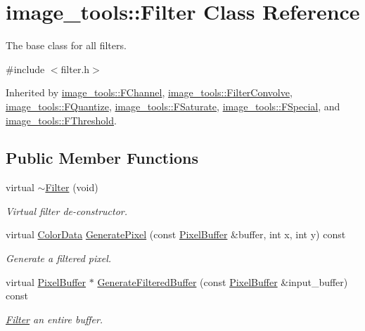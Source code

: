 \hypertarget{classimage__tools_1_1Filter}{}\section{image\+\_\+tools\+:\+:Filter Class Reference}
\label{classimage__tools_1_1Filter}


The base class for all filters.  




{\ttfamily \#include $<$filter.\+h$>$}



Inherited by \hyperlink{classimage__tools_1_1FChannel}{image\+\_\+tools\+::\+F\+Channel}, \hyperlink{classimage__tools_1_1FilterConvolve}{image\+\_\+tools\+::\+Filter\+Convolve}, \hyperlink{classimage__tools_1_1FQuantize}{image\+\_\+tools\+::\+F\+Quantize}, \hyperlink{classimage__tools_1_1FSaturate}{image\+\_\+tools\+::\+F\+Saturate}, \hyperlink{classimage__tools_1_1FSpecial}{image\+\_\+tools\+::\+F\+Special}, and \hyperlink{classimage__tools_1_1FThreshold}{image\+\_\+tools\+::\+F\+Threshold}.

\subsection*{Public Member Functions}
\begin{DoxyCompactItemize}
\item 
virtual \hyperlink{classimage__tools_1_1Filter_acfb43b61626a4556c1cf4288524a757e}{$\sim$\+Filter} (void)\hypertarget{classimage__tools_1_1Filter_acfb43b61626a4556c1cf4288524a757e}{}\label{classimage__tools_1_1Filter_acfb43b61626a4556c1cf4288524a757e}

\begin{DoxyCompactList}\small\item\em Virtual filter de-\/constructor. \end{DoxyCompactList}\item 
virtual \hyperlink{classimage__tools_1_1ColorData}{Color\+Data} \hyperlink{classimage__tools_1_1Filter_afd5d1be5736e343077d331896d4130d9}{Generate\+Pixel} (const \hyperlink{classimage__tools_1_1PixelBuffer}{Pixel\+Buffer} \&buffer, int x, int y) const 
\begin{DoxyCompactList}\small\item\em Generate a filtered pixel. \end{DoxyCompactList}\item 
virtual \hyperlink{classimage__tools_1_1PixelBuffer}{Pixel\+Buffer} $\ast$ \hyperlink{classimage__tools_1_1Filter_a1bdb19eb497a94ea13a2a0d7f6c0f0a5}{Generate\+Filtered\+Buffer} (const \hyperlink{classimage__tools_1_1PixelBuffer}{Pixel\+Buffer} \&input\+\_\+buffer) const 
\begin{DoxyCompactList}\small\item\em \hyperlink{classimage__tools_1_1Filter}{Filter} an entire buffer. \end{DoxyCompactList}\end{DoxyCompactItemize}


